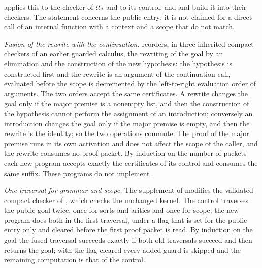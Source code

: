  applies this to the checker of
$\mathcal U_*$ and to its control, and  and
 build it into their checkers. The statement concerns
the public entry; it is not claimed for a direct call of an internal
function with a context and a scope that do not match.

\emph{Fusion of the rewrite with the continuation.}
 reorders, in three inherited compact checkers
of an earlier guarded calculus, the rewriting of the goal by an
elimination and the construction of the new hypothesis: the hypothesis is
constructed first and the rewrite is an argument of the continuation call,
evaluated before the scope is decremented by the left-to-right evaluation
order of arguments. The two orders accept the same certificates. A rewrite
changes the goal only if the major premise is a nonempty list, and then
the construction of the hypothesis cannot perform the assignment of an
introduction; conversely an introduction changes the goal only if the
major premise is empty, and then the rewrite is the identity; so the two
operations commute. The proof of the major premise runs in its own
activation and does not affect the scope of the caller, and the rewrite
consumes no proof packet. By induction on the number of packets each new
program accepts exactly the certificates of its control and consumes the
same suffix. These programs do not implement .

\emph{One traversal for grammar and scope.} The supplement of
 modifies the validated compact checker
of , which checks the unchanged kernel. The
control traverses the public goal twice, once for sorts and arities and
once for scope; the new program does both in the first traversal, under a
flag that is set for the public entry only and cleared before the first
proof packet is read. By induction on the goal the fused traversal
succeeds exactly if both old traversals succeed and then returns the goal;
with the flag cleared every added guard is skipped and the remaining
computation is that of the control.

